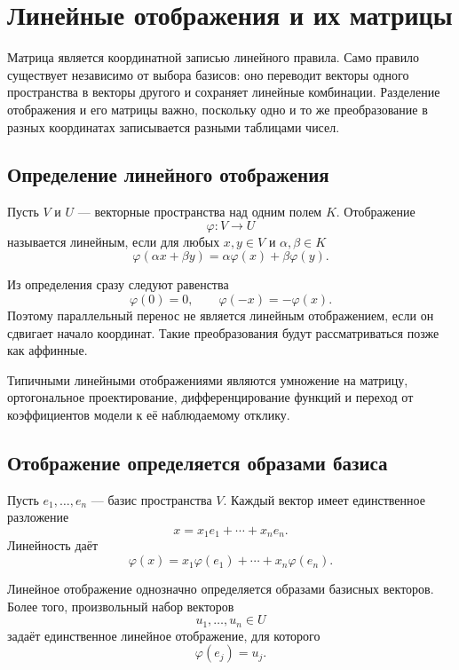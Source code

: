 \section{Линейные отображения и их матрицы}
\label{sec:linear-maps}

Матрица является координатной записью линейного правила. Само правило существует независимо от выбора базисов: оно переводит векторы одного пространства в векторы другого и сохраняет линейные комбинации. Разделение отображения и его матрицы важно, поскольку одно и то же преобразование в разных координатах записывается разными таблицами чисел.

\subsection{Определение линейного отображения}

\begin{definition}
Пусть \(V\) и \(U\) --- векторные пространства над одним полем \(K\).
Отображение
\[
\varphi\colon V\to U
\]
называется линейным, если для любых \(x,y\in V\) и
\(\alpha,\beta\in K\)
\[
\varphi(\alpha x+\beta y)
=
\alpha\varphi(x)+\beta\varphi(y).
\]
\end{definition}

Из определения сразу следуют равенства
\[
\varphi(0)=0,
\qquad
\varphi(-x)=-\varphi(x).
\]
Поэтому параллельный перенос не является линейным отображением, если он сдвигает начало координат. Такие преобразования будут рассматриваться позже как аффинные.

Типичными линейными отображениями являются умножение на матрицу, ортогональное проектирование, дифференцирование функций и переход от коэффициентов модели к её наблюдаемому отклику.

\subsection{Отображение определяется образами базиса}

Пусть \(e_1,\dots,e_n\) --- базис пространства \(V\). Каждый вектор имеет единственное разложение
\[
x=x_1e_1+\cdots+x_ne_n.
\]
Линейность даёт
\[
\varphi(x)
=
x_1\varphi(e_1)+\cdots+x_n\varphi(e_n).
\]

\begin{proposition}
Линейное отображение однозначно определяется образами базисных векторов. Более того, произвольный набор векторов
\[
u_1,\dots,u_n\in U
\]
задаёт единственное линейное отображение, для которого
\[
\varphi(e_j)=u_j.
\]
\end{proposition}

